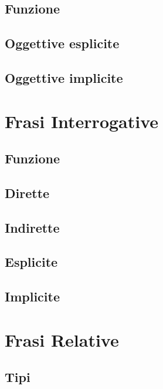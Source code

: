 \documentclass[a4paper,twoside,11pt,chapterprefix=false,bibliography=totocnumbered,listof=flat]{scrbook}
\begin{document}
\section{Funzione}\label{funzione-1}

\section{Oggettive esplicite}\label{oggettive-esplicite}

\section{Oggettive implicite}\label{oggettive-implicite}

\chapter{Frasi Interrogative}\label{frasi-interrogative}

\section{Funzione}\label{funzione-2}

\section{Dirette}\label{dirette}

\section{Indirette}\label{indirette}

\section{Esplicite}\label{esplicite}

\section{Implicite}\label{implicite}

\chapter{Frasi Relative}\label{frasi-relative}

\section{Tipi}\label{tipi}
\end{document}
